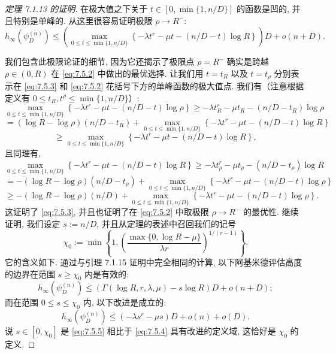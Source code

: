 \begin{proof}[定理 7.1.13 的证明]
在极大值之下关于 \(t \in [0, \min\{1, n/D\}]\) 的函数是凹的, 并且特别是单峰的. 
从这里很容易证明极限 \(\rho \to R^{-}\):
\begin{equation}\label{eq:7.5.3}
h_{\infty}(\psi_D^{(n)}) \le \left(\max_{0 \le t \le \min\{1, n/D\}} \left\{ -\lambda t^r - \mu t - (n/D - t) \log R \right\} \right) D + o(n + D).
\end{equation}

我们包含此极限论证的细节, 因为它还揭示了极限点 \(\rho = R^{-}\) 确实是跨越 \(\rho \in (0, R)\) 
在 \eqref{eq:7.5.2} 中做出的最优选择. 
让我们用 \(t = t_R\) 以及 \(t = t_\rho\) 分别表示在 \eqref{eq:7.5.3} 和 \eqref{eq:7.5.2} 
花括号下方的单峰函数的极大值点. 我们有（注意根据定义有 \(0 \le t_R, t^{\rho} \le \min\{1, n/D\}\)）:
\[ \max_{0 \le t \le \min\{1, n/D\}} \left\{ -\lambda t^r - \mu t - (n/D - t) \log \rho \right\} \ge -\lambda t_R^r - \mu t_R - (n/D - t_R) \log \rho \]
\[ = (\log R - \log \rho)(n/D - t_R) + \max_{0 \le t \le \min\{1, n/D\}} \left\{ -\lambda t^r - \mu t - (n/D - t) \log R \right\} \]
\[ \ge \max_{0 \le t \le \min\{1, n/D\}} \left\{ -\lambda t^r - \mu t - (n/D - t) \log R \right\}, \]
且同理有,
\[ \max_{0 \le t \le \min\{1, n/D\}} \left\{ -\lambda t^r - \mu t - (n/D - t) \log R \right\} \ge -\lambda t_\rho^r - \mu t_\rho - (n/D - t_\rho) \log R \]
\[ = -(\log R - \log \rho)(n/D - t_\rho) + \max_{0 \le t \le \min\{1, n/D\}} \left\{ -\lambda t^r - \mu t - (n/D - t) \log \rho \right\} \]
\[ \ge -(\log R - \log \rho)(n/D) + \max_{0 \le t \le \min\{1, n/D\}} \left\{ -\lambda t^r - \mu t - (n/D - t) \log \rho \right\}. \]
这证明了 \eqref{eq:7.5.3}, 并且也证明了在 \eqref{eq:7.5.2} 中取极限 \(\rho \to R^{-}\) 的最优性. 
继续证明, 我们设定 \(s := n/D\), 并且从定理的表述中召回我们的记号
\[ \chi_0 := \min \left\{ 1, \left( \frac{\max\{0, \log R - \mu\}}{\lambda r} \right)^{1/(r-1)} \right\}. \]
它的含义如下. 通过与引理 7.1.15 证明中完全相同的计算, 
以下阿基米德评估高度的边界在范围 \(s \geq \chi_0\) 内是有效的:
\begin{equation}\label{eq:7.5.4}
h_{\infty}(\psi_D^{(n)}) \le \left(\Gamma(\log R, r, \lambda, \mu) - s\log R\right)D + o(n+D);
\end{equation}
而在范围 \(0 \le s \le \chi_0\) 内, 以下改进是成立的:
\begin{equation}\label{eq:7.5.5}
h_{\infty}(\psi_D^{(n)}) \le (-\lambda s^r - \mu s)D + o(n) + o(D).
\end{equation}
说 \(s \in [0, \chi_0]\) 是 \eqref{eq:7.5.5} 相比于 \eqref{eq:7.5.4} 具有改进的定义域, 这恰好是 \(\chi_0\) 的定义.


\end{proof}
